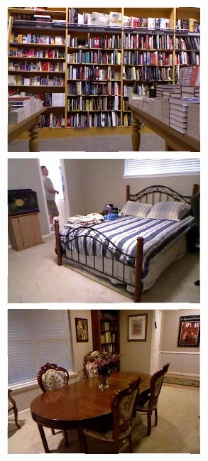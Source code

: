 \begin{figure}[htb]
\begin{subfigure}{0.24\linewidth}
\begin{minipage}[b]{1\linewidth}
  \includegraphics[width=1\linewidth]{figure/Pixel_cla_nyu/3rgb.jpg}\vspace{4pt}
  \includegraphics[width=1\linewidth]{figure/Pixel_cla_nyu/4rgb.jpg}\vspace{4pt}
  \includegraphics[width=1\linewidth]{figure/Pixel_cla_nyu/5rgb.jpg}

\end{minipage}
\end{subfigure}
\end{figure}
